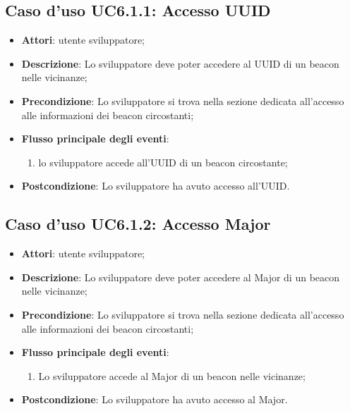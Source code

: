 \documentclass[../AnalisiDeiRequisiti.tex]{subfiles}
\begin{document}
\subsection{Caso d'uso UC6.1.1: Accesso UUID}
\begin{itemize}
\item \textbf{Attori}: utente sviluppatore;
\item \textbf{Descrizione}: Lo sviluppatore deve poter accedere al UUID di un beacon nelle vicinanze; 
      \item \textbf{Precondizione}: Lo sviluppatore si trova nella sezione dedicata all'accesso alle informazioni dei beacon circostanti;

        \item \textbf{Flusso principale degli eventi}:
          \begin{enumerate}
          \item lo sviluppatore accede all'UUID di un beacon circostante;

      \end{enumerate}
    \item \textbf{Postcondizione}: Lo sviluppatore ha avuto accesso all'UUID.
  \end{itemize}
\hypertarget{UC6.1.2}{}
\subsection{Caso d'uso UC6.1.2: Accesso Major}

\begin{itemize}
\item \textbf{Attori}: utente sviluppatore;
\item \textbf{Descrizione}: Lo sviluppatore deve poter accedere al Major di un beacon nelle vicinanze; 
      \item \textbf{Precondizione}: Lo sviluppatore si trova nella sezione dedicata all'accesso alle informazioni dei beacon circostanti;

        \item \textbf{Flusso principale degli eventi}:
          \begin{enumerate}
          \item Lo sviluppatore accede al Major di un beacon nelle vicinanze;

      \end{enumerate}
    \item \textbf{Postcondizione}: Lo sviluppatore ha avuto accesso al Major.
  \end{itemize}
\hypertarget{UC6.1.3}{}
\end{document}

